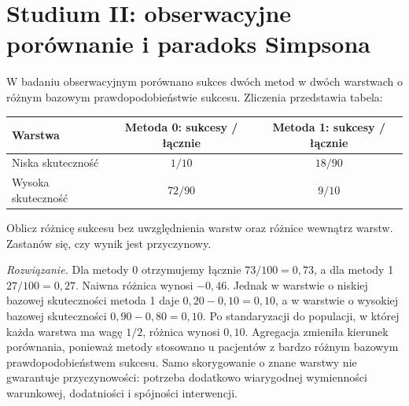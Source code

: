 \section{Studium II: obserwacyjne porównanie i paradoks Simpsona}
\begin{zadanie}\label{ex:simpson-decision}
W badaniu obserwacyjnym porównano sukces dwóch metod w dwóch warstwach o różnym bazowym prawdopodobieństwie sukcesu. Zliczenia przedstawia tabela:
\begin{center}\small
\begin{tabular}{lcc}
\toprule
\textbf{Warstwa} & \textbf{Metoda 0: sukcesy / łącznie} & \textbf{Metoda 1: sukcesy / łącznie}\\
\midrule
Niska skuteczność & $1/10$ & $18/90$\\
Wysoka skuteczność & $72/90$ & $9/10$\\
\bottomrule
\end{tabular}
\end{center}
Oblicz różnicę sukcesu bez uwzględnienia warstw oraz różnice wewnątrz warstw. Zastanów się, czy wynik jest przyczynowy.\par
\emph{Rozwiązanie.} Dla metody 0 otrzymujemy łącznie $73/100=0{,}73$, a dla metody 1 $27/100=0{,}27$. Naiwna różnica wynosi $-0{,}46$. Jednak w warstwie o niskiej bazowej skuteczności metoda 1 daje $0{,}20-0{,}10=0{,}10$, a w warstwie o wysokiej bazowej skuteczności $0{,}90-0{,}80=0{,}10$. Po standaryzacji do populacji, w której każda warstwa ma wagę $1/2$, różnica wynosi $0{,}10$. Agregacja zmieniła kierunek porównania, ponieważ metody stosowano u pacjentów z bardzo różnym bazowym prawdopodobieństwem sukcesu. Samo skorygowanie o znane warstwy nie gwarantuje przyczynowości: potrzeba dodatkowo wiarygodnej wymienności warunkowej, dodatniości i spójności interwencji.
\end{zadanie}

